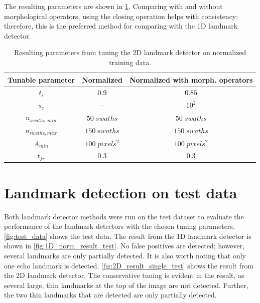 The resulting parameters are shown in \cref{tab:2D_parameters}. Comparing with and without morphological operators, using the closing operation helps with consistency; therefore, this is the preferred method for comparing with the 1D landmark detector. 

\begin{table} [ht]
    \caption{Resulting parameters from tuning the 2D landmark detector on normalized training data.}
    \centering
    \begin{tabular}{ccc}
        \hline
        \textbf{Tunable parameter} & \textbf{Normalized} & \textbf{Normalized with morph. operators} \\ \hline
        $t_i$                      & $0.9$               & $0.85$                                    \\
        $s_c$                      & $-$                 & $10^2$                                    \\
        $n_{swaths, min}$          & $50 \; swaths$      & $50 \; swaths$                            \\
        $n_{swaths, max}$          & $150\; swaths$      & $150 \; swaths$                           \\
        $A_{min}$                  & $100 \; pixels^2$   & $100 \; pixels^2$                         \\
        $t_{fr}$                   & $0.3$               & $0.3$                                     \\ \hline
    \end{tabular}
    \label{tab:2D_parameters}
\end{table}

\newpage

\section{Landmark detection on test data}

Both landmark detector methods were run on the test dataset to evaluate the performance of the landmark detectors with the chosen tuning parameters. \cref{fig:test_data} shows the test data. The result from the 1D landmark detector is shown in \cref{fig:1D_norm_result_test}. No false positives are detected; however, several landmarks are only partially detected. It is also worth noting that only one echo landmark is detected. \cref{fig:2D_result_single_test} shows the result from the 2D landmark detector. The conservative tuning is evident in the result, as several large, thin landmarks at the top of the image are not detected. Further, the two thin landmarks that are detected are only partially detected. 

